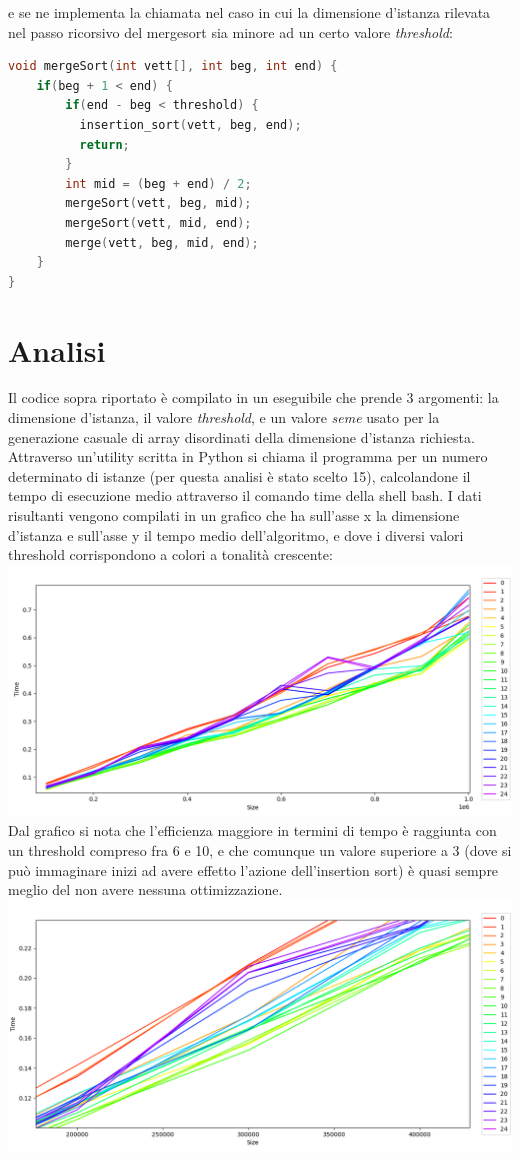 \documentclass[a4paper,11pt]{article}
\begin{document}
e se ne implementa la chiamata nel caso in cui la dimensione d'istanza rilevata nel passo ricorsivo del mergesort sia minore ad un certo valore \textit{threshold}:
\begin{lstlisting}[language=C++]
void mergeSort(int vett[], int beg, int end) {
    if(beg + 1 < end) {
        if(end - beg < threshold) {
          insertion_sort(vett, beg, end);
          return;
        }
        int mid = (beg + end) / 2;
        mergeSort(vett, beg, mid);
        mergeSort(vett, mid, end);
        merge(vett, beg, mid, end);
    }
}
\end{lstlisting}
\section{Analisi}
Il codice sopra riportato è compilato in un eseguibile che prende 3 argomenti: la dimensione d'istanza, il valore \textit{threshold}, e un valore \textit{seme} usato per la generazione casuale
di array disordinati della dimensione d'istanza richiesta. Attraverso un'utility scritta in Python si chiama il programma per un numero determinato di istanze (per questa analisi è stato scelto 15),
calcolandone il tempo di esecuzione medio attraverso il comando time della shell bash. I dati risultanti vengono compilati in un grafico che ha sull'asse x la dimensione d'istanza e sull'asse y il tempo
medio dell'algoritmo, e dove i diversi valori threshold corrispondono a colori a tonalità crescente:
\includegraphics[scale = 0.5]{Figure_1.png}
Dal grafico si nota che l'efficienza maggiore in termini di tempo è raggiunta con un threshold compreso fra 6 e 10, e che comunque un valore superiore a 3 (dove si può immaginare inizi ad avere effetto l'azione dell'insertion sort)
è quasi sempre meglio del non avere nessuna ottimizzazione.
\includegraphics[scale = 0.23]{Figure_2.png}
\end{document}
